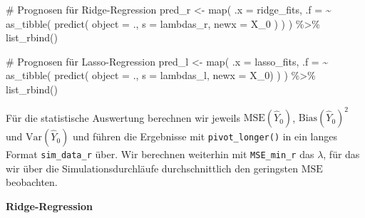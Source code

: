 \documentclass[
  a4paper,
  DIV=11,
  oneside]{scrreprt}
\newenvironment{Shaded}{\begin{snugshade}}{\end{snugshade}}
\newcommand{\AttributeTok}[1]{\textcolor[rgb]{0.40,0.45,0.13}{#1}}
\newcommand{\CommentTok}[1]{\textcolor[rgb]{0.37,0.37,0.37}{#1}}
\newcommand{\FunctionTok}[1]{\textcolor[rgb]{0.28,0.35,0.67}{#1}}
\newcommand{\NormalTok}[1]{\textcolor[rgb]{0.00,0.23,0.31}{#1}}
\newcommand{\OtherTok}[1]{\textcolor[rgb]{0.00,0.23,0.31}{#1}}
\newcommand{\SpecialCharTok}[1]{\textcolor[rgb]{0.37,0.37,0.37}{#1}}
\begin{document}
\begin{Shaded}
\begin{Highlighting}[]
\CommentTok{\# Prognosen für Ridge{-}Regression}
\NormalTok{pred\_r }\OtherTok{\textless{}{-}} \FunctionTok{map}\NormalTok{(}
  \AttributeTok{.x =}\NormalTok{ ridge\_fits, }
  \AttributeTok{.f =} \SpecialCharTok{\textasciitilde{}} \FunctionTok{as\_tibble}\NormalTok{(}
    \FunctionTok{predict}\NormalTok{(}
      \AttributeTok{object =}\NormalTok{ ., }
      \AttributeTok{s =}\NormalTok{ lambdas\_r, }
      \AttributeTok{newx =}\NormalTok{ X\_0}
\NormalTok{    )}
\NormalTok{  ) }
\NormalTok{) }\SpecialCharTok{\%\textgreater{}\%}
  \FunctionTok{list\_rbind}\NormalTok{() }

\CommentTok{\# Prognosen für Lasso{-}Regression}
\NormalTok{pred\_l }\OtherTok{\textless{}{-}} \FunctionTok{map}\NormalTok{(}
  \AttributeTok{.x =}\NormalTok{ lasso\_fits, }
  \AttributeTok{.f =} \SpecialCharTok{\textasciitilde{}} \FunctionTok{as\_tibble}\NormalTok{(}
    \FunctionTok{predict}\NormalTok{(}
      \AttributeTok{object =}\NormalTok{ ., }
      \AttributeTok{s =}\NormalTok{ lambdas\_l, }
      \AttributeTok{newx =}\NormalTok{ X\_0)}
\NormalTok{    ) }
\NormalTok{) }\SpecialCharTok{\%\textgreater{}\%}
  \FunctionTok{list\_rbind}\NormalTok{() }
\end{Highlighting}
\end{Shaded}

Für die statistische Auswertung berechnen wir jeweils
\(\text{MSE}(\widehat{Y}_0)\), \(\text{Bias}(\widehat{Y}_0)^2\) und
\(\text{Var}(\widehat{Y}_0)\) und führen die Ergebnisse mit
\texttt{pivot\_longer()} in ein langes Format \texttt{sim\_data\_r}
über. Wir berechnen weiterhin mit \texttt{MSE\_min\_r} das \(\lambda\),
für das wir über die Simulationsdurchläufe durchschnittlich den
geringsten \(\text{MSE}\) beobachten.

\textbf{Ridge-Regression}
\end{document}
